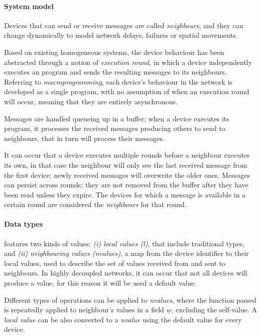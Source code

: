 
\paragraph{System model}
Devices that can send or receive messages are called \emph{neighbours}, and they can change dynamically to model network
delays, failures or spatial movements.

Based on existing homogeneous systems, the device behaviour has been abstracted through a notion of \emph{execution round},
in which a device independently executes an \xc{} program and sends the resulting messages to its neighbours.
Referring to \emph{macroprogramming}, each device's behaviour in the network is developed as a single program, with no
assumption of when an execution round will occur, meaning that they are entirely asynchronous.

Messages are handled queueing up in a buffer; when a device executes its \xc{} program, it processes the received
messages producing others to send to neighbours, that in turn will process their messages.

It can occur that a device executes multiple rounds before a neighbour executes its own, in that case the neighbour will
only see the last received message from the first device; newly received messages will overwrite the older ones.
Messages can persist across rounds; they are not removed from the buffer after they have been read unless they expire.
The devices for which a message is available in a certain round are considered the \emph{neighbours} for that round.

\paragraph{Data types}
\xc{} features two kinds of values:
    \emph{(i)} \emph{local values (l)}, that include traditional types, and
    \emph{(ii)} \emph{neighbouring values (nvalues)}, a map from the device identifier to their local values, used to describe
        the set of values received from and sent to neighbours.
In highly decoupled networks, it can occur that not all devices will produce a value, for this reason it will be used
a default value.

Different types of operations can be applied to \emph{nvalues}, where the function passed is repeatedly applied to
neighbour's values in a field $\underline{w}$, excluding the self-value.
A \emph{local value} can be also converted to a \emph{nvalue} using the default value for every device.

